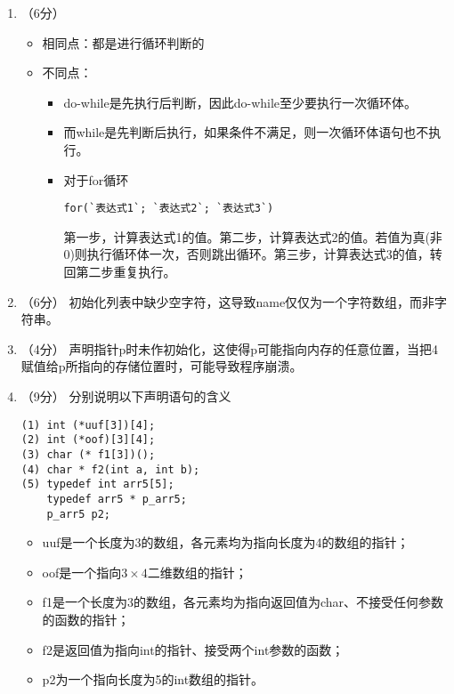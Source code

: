 \documentclass[8pt]{article}
\begin{document}
\begin{CJK}{UTF8}{gkai}
\begin{enumerate}
\item （6分）
\begin{itemize}
\item
相同点：都是进行循环判断的
\item
不同点：
\begin{itemize}
\item
do-while是先执行后判断，因此do-while至少要执行一次循环体。
\item
而while是先判断后执行，如果条件不满足，则一次循环体语句也不执行。
\item 
对于for循环
\begin{lstlisting}
for(`表达式1`; `表达式2`; `表达式3`)
\end{lstlisting}
第一步，计算表达式1的值。第二步，计算表达式2的值。若值为真(非0)则执行循环体一次，否则跳出循环。第三步，计算表达式3的值，转回第二步重复执行。
\end{itemize}
\end{itemize}
\item （6分）
初始化列表中缺少空字符，这导致name仅仅为一个字符数组，而非字符串。
\item （4分）
声明指针p时未作初始化，这使得p可能指向内存的任意位置，当把4赋值给p所指向的存储位置时，可能导致程序崩溃。
\item （9分）
分别说明以下声明语句的含义
\begin{lstlisting}
(1) int (*uuf[3])[4];
(2) int (*oof)[3][4]; 
(3) char (* f1[3])();
(4) char * f2(int a, int b);
(5) typedef int arr5[5];
    typedef arr5 * p_arr5;
    p_arr5 p2;
\end{lstlisting}
\begin{itemize}
\item[(1)] uuf是一个长度为3的数组，各元素均为指向长度为4的数组的指针；
\item[(2)] oof是一个指向$3\times4$二维数组的指针；
\item[(3)] f1是一个长度为3的数组，各元素均为指向返回值为char、不接受任何参数的函数的指针；
\item[(4)] f2是返回值为指向int的指针、接受两个int参数的函数；
\item[(5)] p2为一个指向长度为5的int数组的指针。
\end{itemize}
\end{enumerate}



\end{CJK}
\end{document}
